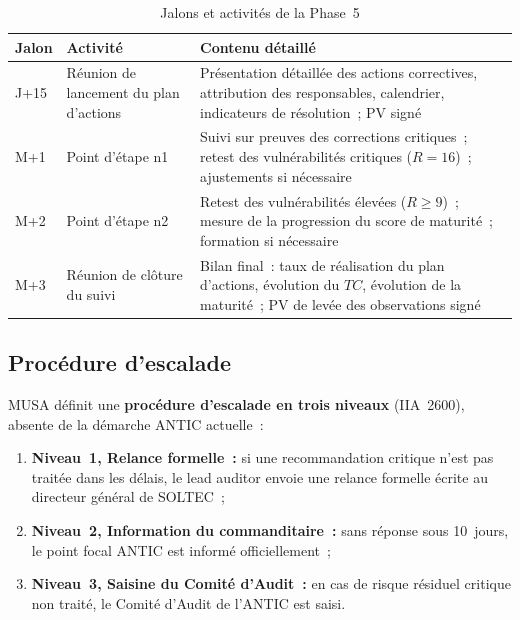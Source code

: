 \documentclass[12pt,a4paper,oneside]{report}
\begin{document}
\begin{table}[H]
	\centering\small
	\caption{Jalons et activit\'es de la Phase~5}
	\label{tab:jalons_p5}
	\begin{tabularx}{\textwidth}{p{2cm}p{3cm}X}
		\toprule
		\rowcolor{theadcolor}
		\color{white}\textbf{Jalon} &
		\color{white}\textbf{Activit\'e} &
		\color{white}\textbf{Contenu d\'etaill\'e} \\
		\midrule
		J+15 & R\'eunion de lancement du plan d'actions &
		Pr\'esentation d\'etaill\'ee des actions correctives, attribution des responsables,
		calendrier, indicateurs de r\'esolution~; PV sign\'e \\
		M+1 & Point d'\'etape n\textdegree{}1 &
		Suivi sur preuves des corrections critiques~; retest des vuln\'erabilit\'es
		critiques ($R=16$)~; ajustements si n\'ecessaire \\
		M+2 & Point d'\'etape n\textdegree{}2 &
		Retest des vuln\'erabilit\'es \'elev\'ees ($R \geq 9$)~; mesure de la
		progression du score de maturit\'e~; formation si n\'ecessaire \\
		M+3 & R\'eunion de cl\^oture du suivi &
		Bilan final~: taux de r\'ealisation du plan d'actions, \'evolution du $TC$,
		\'evolution de la maturit\'e~; PV de lev\'ee des observations sign\'e \\
		\bottomrule
	\end{tabularx}
\end{table}

\subsection{Proc\'edure d'escalade}

MUSA d\'efinit une \textbf{proc\'edure d'escalade en trois niveaux} (IIA~2600),
absente de la d\'emarche ANTIC actuelle~:

\begin{enumerate}[leftmargin=*, itemsep=4pt]
	\item \textbf{Niveau~1, Relance formelle~:} si une recommandation critique
	n'est pas trait\'ee dans les d\'elais, le lead auditor envoie une relance
	formelle \'ecrite au directeur g\'en\'eral de SOLTEC~;
	\item \textbf{Niveau~2, Information du commanditaire~:} sans r\'eponse
	sous 10~jours, le point focal ANTIC est inform\'e officiellement~;
	\item \textbf{Niveau~3, Saisine du Comit\'e d'Audit~:} en cas de risque
	r\'esiduel critique non trait\'e, le Comit\'e d'Audit de l'ANTIC est saisi.
\end{enumerate}
\end{document}
